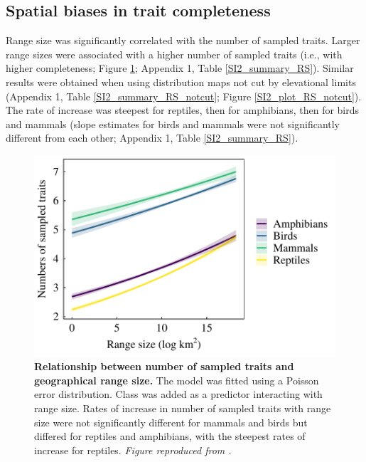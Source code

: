 \subsection{Spatial biases in trait completeness}
Range size was significantly correlated with the number of sampled traits. Larger range sizes were associated with a higher number of sampled traits (i.e., with higher completeness; Figure \ref{1_Range_size}; Appendix 1, Table \ref{SI2_summary_RS}). Similar results were obtained when using distribution maps not cut by elevational limits (Appendix 1, Table \ref{SI2_summary_RS_notcut}; Figure \ref{SI2_plot_RS_notcut}). The rate of increase was steepest for reptiles, then for amphibians, then for birds and mammals (slope estimates for birds and mammals were not significantly different from each other; Appendix 1, Table \ref{SI2_summary_RS}).

\begin{figure}[h!]
\centering
\includegraphics[scale=0.7]{figures/Chapter2/Figure_4}
\caption[Relationship between number of sampled traits and geographical range size]{\textbf{Relationship between number of sampled traits and geographical range size.} The model  was fitted using a Poisson error distribution. Class was added as a predictor interacting with range size. Rates of increase in number of sampled traits with range size were not significantly different for mammals and birds but differed for reptiles and amphibians, with the steepest rates of increase for reptiles. \textit{Figure reproduced from \citet{Etard2020}.}}
\label{1_Range_size}
\end{figure}

